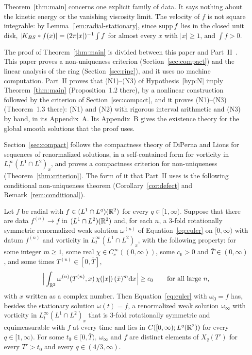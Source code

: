 Theorem~\ref{thm:main} concerns one explicit family of data. It says nothing about the kinetic
energy or the vanishing viscosity limit. The velocity of $f$ is not square integrable: by
Lemma~\ref{lem:radial-stationary}, since $\operatorname{supp} f$ lies in the closed unit disk,
$|K_{BS}\ast f(x)|=(2\pi|x|)^{-1}\int f$ for almost every $x$ with $|x|\ge1$, and
$\int f>0$.

The proof of Theorem~\ref{thm:main} is divided between this paper and
Part~II~\cite{PartII}. This paper proves a non-uniqueness criterion
(Section~\ref{sec:compact}) and the linear analysis of the ring
(Section~\ref{sec:ring}), and it uses no machine computation. Part~II proves
that \textup{(N1)}--\textup{(N3)} of Hypothesis~\ref{hyp:N} imply
Theorem~\ref{thm:main} (Proposition~1.2 there), by a nonlinear construction
followed by the criterion of Section~\ref{sec:compact}, and it proves
\textup{(N1)}--\textup{(N3)} (Theorem~1.3 there): \textup{(N1)} and
\textup{(N2)} with rigorous interval arithmetic and \textup{(N3)} by hand, in
its Appendix~A. Its Appendix~B gives the existence theory for the global smooth solutions
that the proof uses.

Section~\ref{sec:compact} follows the compactness theory of DiPerna and Lions for
sequences of renormalized solutions, in a self-contained form for vorticity in
$L^\infty_t(L^1\cap L^2)_x$, and proves a compactness criterion for
non-uniqueness (Theorem~\ref{thm:criterion}). The form of it that Part~II uses is
the following conditional non-uniqueness theorem (Corollary~\ref{cor:defect} and
Remark~\ref{rem:conditional}).

\begin{theorem}
\label{thm:conditional}
Let $f$ be radial with $f\in (L^1\cap L^q)(\mathbb{R}^2)$ for every $q\in[1,\infty)$.
Suppose that there are data $f^{(n)}\to f$ in $(L^1\cap L^2)(\mathbb{R}^2)$ and, for each
$n$, a $3$-fold rotationally symmetric renormalized weak solution $\omega^{(n)}$ of
Equation~\eqref{eq:euler} on $[0,\infty)$ with datum $f^{(n)}$ and vorticity in
$L^\infty_t(L^1\cap L^2)_x$, with the following property: for some integer
$m\ge1$, some real $\chi\in C_c^\infty((0,\infty))$, some $c_0>0$ and
$\bar T\in(0,\infty)$, and some times $T^{(n)}\in[0,\bar T]$,
\[
\Big|\int_{\mathbb{R}^2}\omega^{(n)}(T^{(n)},x)\,\chi(|x|)\,(\bar x)^m\dd x\Big|\ge c_0
\qquad\text{for all large }n,
\]
with $x$ written as a complex number. Then Equation~\eqref{eq:euler} with
$\omega_0=f$ has, besides the stationary solution $\omega(t)=f$, a renormalized
weak solution $\omega_\infty$ with vorticity in $L^\infty_t(L^1\cap L^2)_x$ that is
$3$-fold rotationally symmetric and equimeasurable with $f$ at every time and lies
in $C([0,\infty);L^q(\mathbb{R}^2))$ for every $q\in[1,\infty)$. For some
$t_0\in[0,\bar T)$, $\omega_\infty$ and $f$ are distinct elements of $X_q(T')$ for
every $T'>t_0$ and every $q\in(4/3,\infty)$.
\end{theorem}

